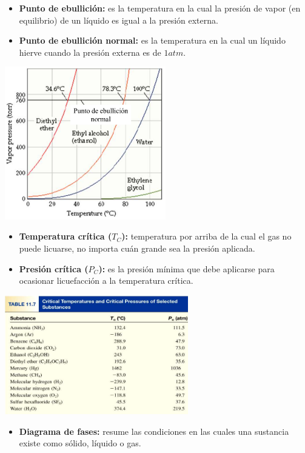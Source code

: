             \begin{itemize}
                \item \textbf{Punto de ebullición:} es la temperatura en la cual la presión de vapor (en equilibrio) de un líquido es igual a la presión externa.
                \item \textbf{Punto de ebullición normal:} es la temperatura en la cual un líquido hierve cuando la presión externa es de $1atm$.
            \end{itemize}
            \begin{center} \includegraphics[width=7cm]{./imagenes/puntoDeEbullicion.png} \end{center}
            \begin{itemize}
                \item \textbf{Temperatura crítica ($T_C$):} temperatura por arriba de la cual el gas no puede licuarse, no importa cuán grande sea la presión aplicada.
                \item \textbf{Presión crítica ($P_C$):} es la presión mínima que debe aplicarse para ocasionar licuefacción a la temperatura crítica.
            \end{itemize}
            \begin{center} \includegraphics[width=8cm]{./imagenes/presionYTemperaturaCritica.png} \end{center}
            \begin{itemize}
                \item \textbf{Diagrama de fases:} resume las condiciones en las cuales una sustancia existe como sólido, líquido o gas.
            \end{itemize}

